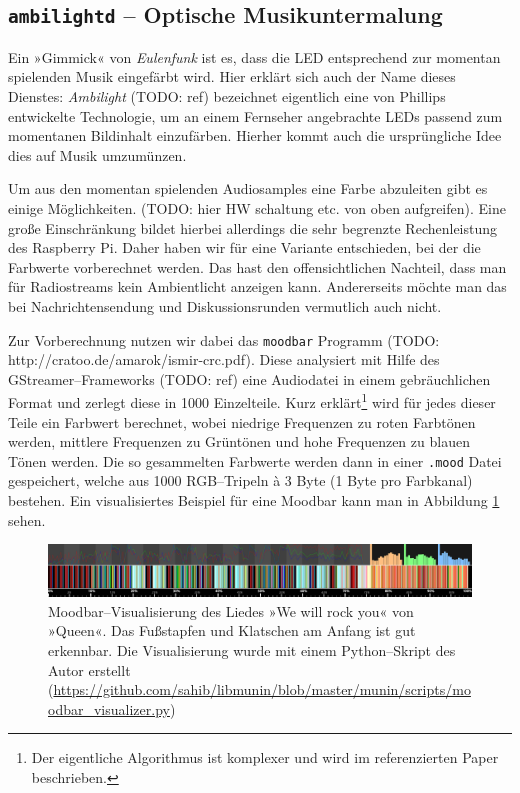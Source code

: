 \documentclass[11pt,ngerman,toc=listof,index=totoc]{scrreprt}
\begin{document}
\subsection{\texorpdfstring{\texttt{ambilightd} -- Optische
Musikuntermalung}{ambilightd -- Optische Musikuntermalung}}\label{ambilightd-optische-musikuntermalung}

Ein »Gimmick« von \emph{Eulenfunk} ist es, dass die LED entsprechend zur
momentan spielenden Musik eingefärbt wird. Hier erklärt sich auch der
Name dieses Dienstes: \emph{Ambilight} (TODO: ref) bezeichnet eigentlich
eine von Phillips entwickelte Technologie, um an einem Fernseher
angebrachte LEDs passend zum momentanen Bildinhalt einzufärben. Hierher
kommt auch die ursprüngliche Idee dies auf Musik umzumünzen.

Um aus den momentan spielenden Audiosamples eine Farbe abzuleiten gibt
es einige Möglichkeiten. (TODO: hier HW schaltung etc. von oben
aufgreifen). Eine große Einschränkung bildet hierbei allerdings die sehr
begrenzte Rechenleistung des Raspberry Pi. Daher haben wir für eine
Variante entschieden, bei der die Farbwerte vorberechnet werden. Das
hast den offensichtlichen Nachteil, dass man für Radiostreams kein
Ambientlicht anzeigen kann. Andererseits möchte man das bei
Nachrichtensendung und Diskussionsrunden vermutlich auch nicht.

Zur Vorberechnung nutzen wir dabei das \texttt{moodbar} Programm (TODO:
http://cratoo.de/amarok/ismir-crc.pdf). Diese analysiert mit Hilfe des
GStreamer--Frameworks (TODO: ref) eine Audiodatei in einem
gebräuchlichen Format und zerlegt diese in 1000 Einzelteile. Kurz
erklärt\footnote{Der eigentliche Algorithmus ist komplexer und wird im
  referenzierten Paper beschrieben.} wird für jedes dieser Teile ein
Farbwert berechnet, wobei niedrige Frequenzen zu roten Farbtönen werden,
mittlere Frequenzen zu Grüntönen und hohe Frequenzen zu blauen Tönen
werden. Die so gesammelten Farbwerte werden dann in einer \texttt{.mood}
Datei gespeichert, welche aus 1000 RGB--Tripeln à 3 Byte (1 Byte pro
Farbkanal) bestehen. Ein visualisiertes Beispiel für eine Moodbar kann
man in Abbildung \ref{queen-moodbar} sehen.

\begin{figure}[h!]
  \centering
  \includegraphics[width=1.0\textwidth]{images/we-will-rock-you-mood.pdf}
  \caption{Moodbar--Visualisierung des Liedes »We will rock you« von »Queen«.
  Das Fußstapfen und Klatschen am Anfang ist gut erkennbar.
  Die Visualisierung wurde mit einem Python--Skript des Autor erstellt 
  (\url{https://github.com/sahib/libmunin/blob/master/munin/scripts/moodbar\_visualizer.py})}
  \label{queen-moodbar}
\end{figure}
\end{document}
